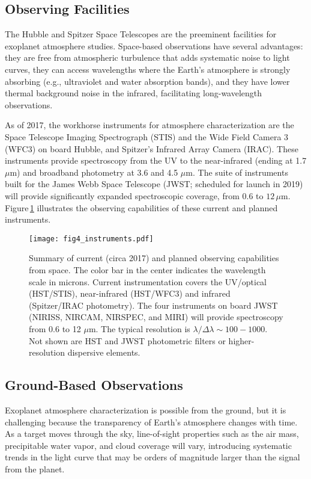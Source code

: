 \documentclass[graybox,natbib,nosecnum]{svmult}
\begin{document}
\subsection{Observing Facilities}
The Hubble and Spitzer Space Telescopes are the preeminent facilities for exoplanet atmosphere studies.  Space-based observations have several advantages: they are free from atmospheric turbulence that adds systematic noise to light curves, they can access wavelengths where the Earth's atmosphere is strongly absorbing (e.g., ultraviolet and water absorption bands), and they have lower thermal background noise in the infrared, facilitating long-wavelength observations. 

As of 2017, the workhorse instruments for atmosphere characterization are the Space Telescope Imaging Spectrograph (STIS) and the Wide Field Camera 3 (WFC3) on board Hubble, and Spitzer's Infrared Array Camera (IRAC).  These instruments provide spectroscopy from the UV to the near-infrared (ending at 1.7 $\mu$m) and broadband photometry at 3.6 and 4.5 $\mu$m. The suite of instruments built for the James Webb Space Telescope (JWST; scheduled for launch in 2019) will provide significantly expanded spectroscopic coverage, from $0.6$ to $12\,\mu$m.  Figure\,\ref{fig:instruments} illustrates the observing capabilities of these current and planned instruments. 

\begin{figure}
\begin{centering}
\texttt{[image: fig4\_instruments.pdf]}
\caption{Summary of current (circa 2017) and planned observing capabilities from space. The color bar in the center indicates the wavelength scale in microns. Current instrumentation covers the UV/optical (HST/STIS), near-infrared (HST/WFC3) and infrared (Spitzer/IRAC photometry). The four instruments on board JWST (NIRISS, NIRCAM, NIRSPEC, and MIRI) will provide spectroscopy from 0.6 to 12 $\mu$m. The typical resolution is $\lambda/\Delta \lambda \sim100 - 1000$. Not shown are HST and JWST photometric filters or higher-resolution dispersive elements.}
\label{fig:instruments}       
\end{centering}
\end{figure}


\subsection{Ground-Based Observations}
Exoplanet atmosphere characterization is possible from the ground, but it is challenging because
the transparency of Earth's atmosphere changes with time.  As a target moves through the sky, line-of-sight properties such as the air mass, precipitable water vapor, and cloud coverage will vary, introducing systematic trends in the light curve that may be orders of magnitude larger than the signal from the planet. 
\end{document}
